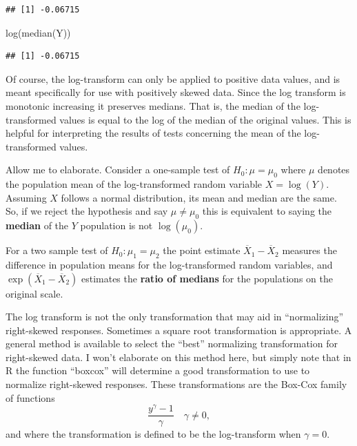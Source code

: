 \documentclass[
]{book}
\newenvironment{Shaded}{\begin{snugshade}}{\end{snugshade}}
\newcommand{\FunctionTok}[1]{\textcolor[rgb]{0.00,0.00,0.00}{#1}}
\newcommand{\NormalTok}[1]{#1}
\begin{document}
\begin{verbatim}
## [1] -0.06715
\end{verbatim}

\begin{Shaded}
\begin{Highlighting}[]
\FunctionTok{log}\NormalTok{(}\FunctionTok{median}\NormalTok{(Y))}
\end{Highlighting}
\end{Shaded}

\begin{verbatim}
## [1] -0.06715
\end{verbatim}

Of course, the log-transform can only be applied to positive data values, and is meant specifically for use with positively skewed data. Since the log transform is monotonic increasing it preserves medians. That is, the median of the log-transformed values is equal to the log of the median of the original values. This is helpful for interpreting the results of tests concerning the mean of the log-transformed values.

Allow me to elaborate. Consider a one-sample test of \(H_0:\mu = \mu_0\) where \(\mu\) denotes the population mean of the log-transformed random variable \(X = \log(Y)\). Assuming \(X\) follows a normal distribution, its mean and median are the same. So, if we reject the hypothesis and say \(\mu \ne \mu_0\) this is equivalent to saying the \textbf{median} of the \(Y\) population is not \(\log(\mu_0)\).

For a two sample test of \(H_0:\mu_1 = \mu_2\) the point estimate \(\overline X_1 - \overline X_2\) measures the difference in population means for the log-transformed random variables, and \(\exp(\overline X_1 - \overline X_2)\) estimates the \textbf{ratio of medians} for the populations on the original scale.

The log transform is not the only transformation that may aid in ``normalizing'' right-skewed responses. Sometimes a square root transformation is appropriate. A general method is available to select the ``best'' normalizing transformation for right-skewed data. I won't elaborate on this method here, but simply note that in R the function ``boxcox'' will determine a good transformation to use to normalize right-skewed responses. These transformations are the Box-Cox family of functions
\[\frac{y^\gamma - 1}{\gamma}\quad \gamma \ne 0, \]
and where the transformation is defined to be the log-transform when \(\gamma = 0\).
\end{document}
